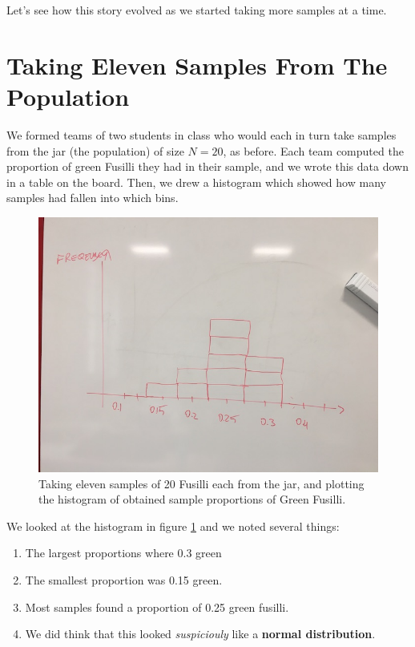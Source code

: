 \documentclass[]{book}
\providecommand{\tightlist}{%
  \setlength{\itemsep}{0pt}\setlength{\parskip}{0pt}}
\begin{document}
Let's see how this story evolved as we started taking more samples at a time.

\hypertarget{taking-eleven-samples-from-the-population}{%
\section{Taking Eleven Samples From The Population}\label{taking-eleven-samples-from-the-population}}

We formed teams of two students in class who would each in turn take samples from the jar (the population) of size \(N=20\), as before. Each team computed the proportion of green Fusilli they had in their sample, and we wrote this data down in a table on the board. Then, we drew a histogram which showed how many samples had fallen into which bins.

\begin{figure}

{\centering \includegraphics[width=0.9\linewidth]{images/pasta6} 

}

\caption{Taking eleven samples of 20 Fusilli each from the jar, and plotting the histogram of obtained sample proportions of Green Fusilli.}\label{fig:pasta6}
\end{figure}

We looked at the histogram in figure \ref{fig:pasta6} and we noted several things:

\begin{enumerate}
\def\labelenumi{\arabic{enumi}.}
\tightlist
\item
  The largest proportions where 0.3 green
\item
  The smallest proportion was 0.15 green.
\item
  Most samples found a proportion of 0.25 green fusilli.
\item
  We did think that this looked \emph{suspiciouly} like a \textbf{normal distribution}.
\end{enumerate}
\end{document}
